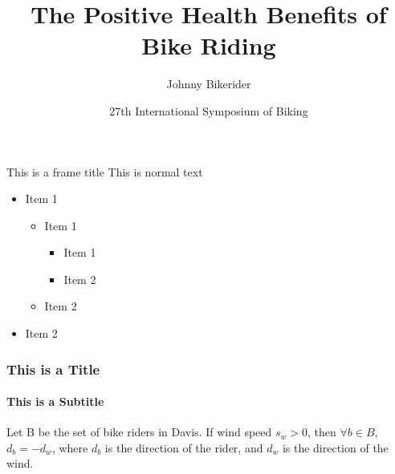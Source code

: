 \documentclass[aspectratio=169]{beamer}
\title{The Positive Health Benefits of Bike Riding}
\date[ISPN ’80]{27th International Symposium of Biking}
\author[Euclid]{Johnny Bikerider }
\institute{University of California, Davis }
\begin{document}
\begin{frame}
\titlepage
\end{frame}

\begin{frame}{This is a frame title}
\label{list}
This is normal text

\begin{itemize}
	\item Item 1
	\begin{itemize}
	\item Item 1
	\begin{itemize}
	\item Item 1
	\item Item 2
\end{itemize}
	\item Item 2
\end{itemize}
	\item Item 2
\end{itemize}
\end{frame}

\begin{frame}
\frametitle{This is a Title}
\framesubtitle{This is a Subtitle}

\begin{theorem}
Let B be the set of bike riders in Davis. If wind speed $s_{w} > 0$, then $\forall b \in B$, $d_{b} = - d_{w}$, where $d_{b}$ is the direction of the rider, and $d_{w}$ is the direction of the wind. 
\end{theorem}

                \hyperlink{list}{}
\end{frame}
\end{document}
